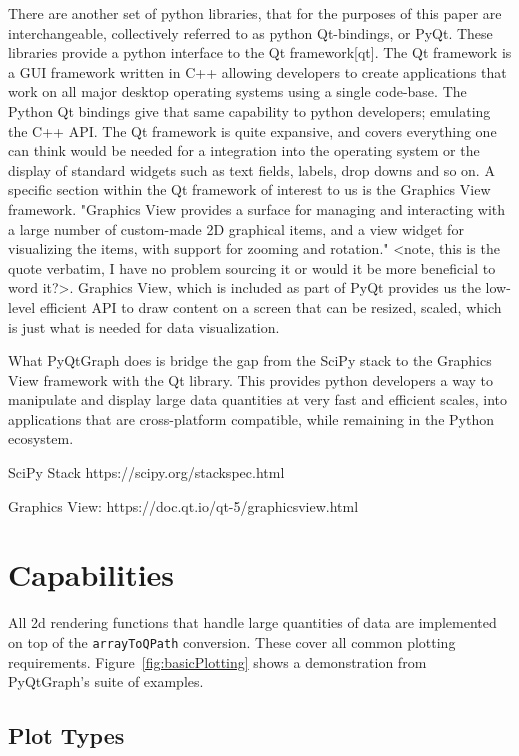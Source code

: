 \documentclass[journal]{vgtc}                %
\begin{document}
There are another set of python libraries, that for the purposes of this paper are interchangeable, collectively referred to as python Qt-bindings, or PyQt.  These libraries provide a python interface to the Qt framework[qt].  The Qt framework is a GUI framework written in C++ allowing developers to create applications that work on all major desktop operating systems using a single code-base.  The Python Qt bindings give that same capability to python developers; emulating the C++ API.  The Qt framework is quite expansive, and covers everything one can think would be needed for a integration into the operating system or the display of standard widgets such as text fields, labels, drop downs and so on.  A specific section within the Qt framework of interest to us is the Graphics View framework.  "Graphics View provides a surface for managing and interacting with a large number of custom-made 2D graphical items, and a view widget for visualizing the items, with support for zooming and rotation."  <note, this is the quote verbatim, I have no problem sourcing it or would it be more beneficial to word it?>. Graphics View, which is included as part of PyQt provides us the low-level efficient API to draw content on a screen that can be resized, scaled, which is just what is needed for data visualization.  

What PyQtGraph does is bridge the gap from the SciPy stack to the Graphics View framework with the Qt library.  This provides python developers a way to manipulate and display large data quantities at very fast and efficient scales, into applications that are cross-platform compatible, while remaining in the Python ecosystem.


SciPy Stack
https://scipy.org/stackspec.html

Graphics View:
https://doc.qt.io/qt-5/graphicsview.html

\color{black}
\section{Capabilities}

All 2d rendering functions that handle large quantities of data are implemented on top of the \texttt{arrayToQPath} conversion. These cover all common plotting requirements. Figure~\ref{fig:basicPlotting} shows a demonstration from PyQtGraph's suite of examples.

\subsection{Plot Types}
\makeBasicPlottingFig
\end{document}
